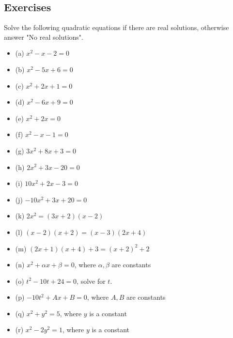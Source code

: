 \documentclass{article}
\begin{document}
\subsection{Exercises}
Solve the following quadratic equations if there are real solutions, otherwise answer "No real solutions".
\begin{itemize}
\item[] (a) $x^2 - x - 2 = 0$\\[50pt]
\item[] (b) $x^2 - 5x + 6 = 0$\\[50pt]
\item[] (c) $x^2 + 2x + 1  = 0$\\[50pt]
\item[] (d) $x^2 - 6x + 9 = 0$\\[50pt]
\item[] (e) $x^2 + 2x = 0$\\[50pt]
\item[] (f) $x^2 - x - 1 = 0$\\[50pt]
\item[] (g) $3x^2 + 8x + 3 = 0$\\[50pt]
\item[] (h) $2x^2 + 3x - 20 = 0$\\[50pt]
\item[] (i) $10x^2 + 2x - 3 = 0$\\[50pt]
\item[] (j) $-10x^2 + 3x + 20 = 0$\\[50pt]
\item[] (k) $2x^2 = (3x + 2)(x-2)$\\[50pt]
\item[] (l) $(x-2)(x+2) = (x-3)(2x+4)$\\[50pt]
\item[] (m) $(2x + 1)(x + 4) + 3 = (x+2)^2 + 2$\\[50pt]
\item[] (n) $x^2 + \alpha x + \beta = 0$, where $\alpha,\beta$ are constants\\[50pt]
\item[] (o) $t^2 - 10t + 24 = 0$, solve for $t$. \\[50pt]
\item[] (p) $-10t^2 + A x + B = 0$, where $A,B$ are constants\\[50pt]
\item[] (q) $x^2 + y^2 = 5$, where $y$ is a constant\\[50pt]
\item[] (r) $x^2 - 2y^2 = 1$, where $y$ is a constant\\[50pt]
\end{itemize}
\clearpage
\end{document}
